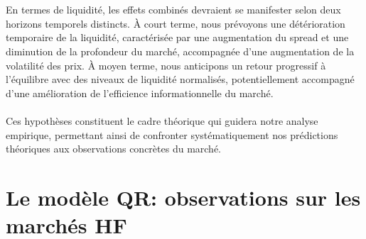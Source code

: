 \documentclass[12pt,a4paper]{article}
\theoremstyle{definition}
\theoremstyle{remark}
\begin{document}
\\
\\
    En termes de liquidité, les effets combinés devraient se manifester selon deux horizons temporels distincts. À court terme, nous prévoyons une détérioration temporaire de la liquidité, caractérisée par une augmentation du spread et une diminution de la profondeur du marché, accompagnée d'une augmentation de la volatilité des prix. À moyen terme, nous anticipons un retour progressif à l'équilibre avec des niveaux de liquidité normalisés, potentiellement accompagné d'une amélioration de l'efficience informationnelle du marché.
\\
\\
    Ces hypothèses constituent le cadre théorique qui guidera notre analyse empirique, permettant ainsi de confronter systématiquement nos prédictions théoriques aux observations concrètes du marché.

    \newpage
    \section{Le modèle QR: observations sur les marchés HF
}
\end{document}
